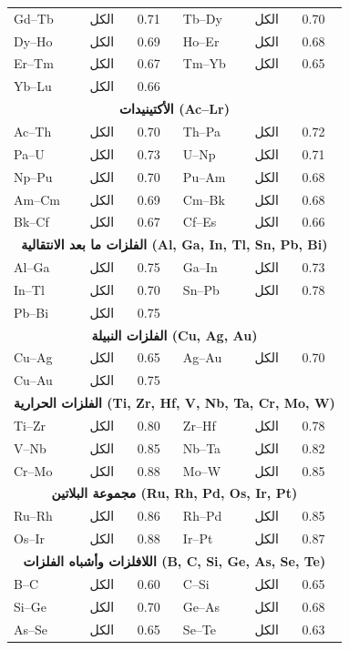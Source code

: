 \documentclass[12pt,a4paper]{article}
\begin{document}
\begin{longtable}{p{2.5cm} p{2.5cm} p{1.2cm} p{2.5cm} p{2.5cm} p{1.2cm}}
		Gd–Tb & الكل & 0.71 & Tb–Dy & الكل & 0.70 \\
		Dy–Ho & الكل & 0.69 & Ho–Er & الكل & 0.68 \\
		Er–Tm & الكل & 0.67 & Tm–Yb & الكل & 0.65 \\
		Yb–Lu & الكل & 0.66 & & & \\
		\multicolumn{6}{c}{\textbf{الأكتينيدات (Ac–Lr)}} \\
		Ac–Th & الكل & 0.70 & Th–Pa & الكل & 0.72 \\
		Pa–U  & الكل & 0.73 & U–Np & الكل & 0.71 \\
		Np–Pu & الكل & 0.70 & Pu–Am & الكل & 0.68 \\
		Am–Cm & الكل & 0.69 & Cm–Bk & الكل & 0.68 \\
		Bk–Cf & الكل & 0.67 & Cf–Es & الكل & 0.66 \\
		\multicolumn{6}{c}{\textbf{الفلزات ما بعد الانتقالية (Al, Ga, In, Tl, Sn, Pb, Bi)}} \\
		Al–Ga & الكل & 0.75 & Ga–In & الكل & 0.73 \\
		In–Tl & الكل & 0.70 & Sn–Pb & الكل & 0.78 \\
		Pb–Bi & الكل & 0.75 & & & \\
		\multicolumn{6}{c}{\textbf{الفلزات النبيلة (Cu, Ag, Au)}} \\
		Cu–Ag & الكل & 0.65 & Ag–Au & الكل & 0.70 \\
		Cu–Au & الكل & 0.75 & & & \\
		\multicolumn{6}{c}{\textbf{الفلزات الحرارية (Ti, Zr, Hf, V, Nb, Ta, Cr, Mo, W)}} \\
		Ti–Zr & الكل & 0.80 & Zr–Hf & الكل & 0.78 \\
		V–Nb & الكل & 0.85 & Nb–Ta & الكل & 0.82 \\
		Cr–Mo & الكل & 0.88 & Mo–W & الكل & 0.85 \\
		\multicolumn{6}{c}{\textbf{مجموعة البلاتين (Ru, Rh, Pd, Os, Ir, Pt)}} \\
		Ru–Rh & الكل & 0.86 & Rh–Pd & الكل & 0.85 \\
		Os–Ir & الكل & 0.88 & Ir–Pt & الكل & 0.87 \\
		\multicolumn{6}{c}{\textbf{اللافلزات وأشباه الفلزات (B, C, Si, Ge, As, Se, Te)}} \\
		B–C  & الكل & 0.60 & C–Si  & الكل & 0.65 \\
		Si–Ge & الكل & 0.70 & Ge–As & الكل & 0.68 \\
		As–Se & الكل & 0.65 & Se–Te & الكل & 0.63 \\
		\bottomrule
	\end{longtable}
	
\end{document}
